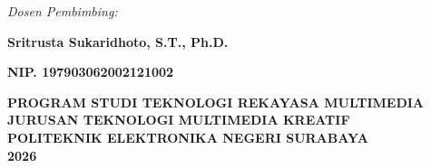 \begin{titlepage}
\begin{center}
    {\fontsize{10pt}{12pt}\selectfont\textit{Dosen Pembimbing:}\par}
    \vspace{0.3cm}
    {\fontsize{12pt}{14pt}\selectfont\textbf{Sritrusta Sukaridhoto, S.T., Ph.D.}\par}
    {\fontsize{12pt}{14pt}\selectfont\textbf{NIP. 197903062002121002}\par}
    
    \vfill
    
    {\fontsize{12pt}{14pt}\selectfont
    \textbf{PROGRAM STUDI TEKNOLOGI REKAYASA MULTIMEDIA}\\
    \textbf{JURUSAN TEKNOLOGI MULTIMEDIA KREATIF}\\
    \textbf{POLITEKNIK ELEKTRONIKA NEGERI SURABAYA}\\
    \textbf{2026}\par}
    
\end{center}
\end{titlepage}
